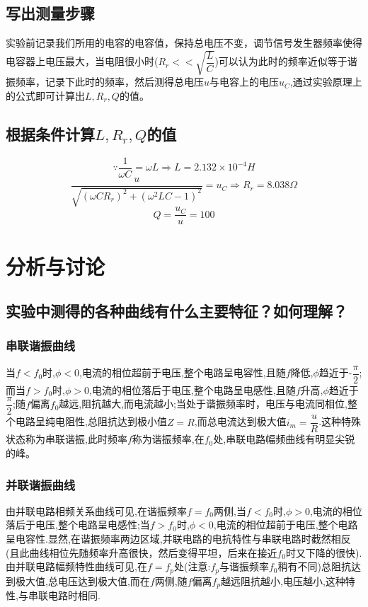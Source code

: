 \documentclass[a4 paper,12pt]{article}
\begin{document}
\subsection{写出测量步骤}
实验前记录我们所用的电容的电容值，保持总电压不变，调节信号发生器频率使得电容器上电压最大，当电阻很小时($R_{r}<<\sqrt{\dfrac{L}{C}}$)可以认为此时的频率近似等于谐振频率，记录下此时的频率，然后测得总电压$u$与电容上的电压$u_{C}$,通过实验原理上的公式即可计算出$L,R_{r},Q$的值。
\subsection{根据条件计算$L,R_{r},Q$的值}
$$\because \dfrac{1}{\omega C}=\omega L\Rightarrow L=2.132\times 10^{-4}H$$
$$\dfrac{u}{\sqrt{(\omega CR_{r})^{2}+(\omega^{2}LC-1)^{2}}}=u_{C}\Rightarrow R_{r}=8.038\Omega$$
$$Q=\dfrac{u_{C}}{u}=100$$
\section{分析与讨论}
\subsection{实验中测得的各种曲线有什么主要特征？如何理解？}
\subsubsection{串联谐振曲线}
当$f<f_{0}$时,$\phi <0$,电流的相位超前于电压,整个电路呈电容性,且随$f$降低,$\phi$趋近于-$\dfrac{\pi}{2}$;而当$f>f_{0}$时,$\phi>0$,电流的相位落后于电压,整个电路呈电感性,且随$f$升高,$\phi$趋近于$\dfrac{\pi}{2}$;随$f$偏离$f_{0}$越远,阻抗越大,而电流越小;当处于谐振频率时，电压与电流同相位,整个电路呈纯电阻性,总阻抗达到极小值$Z=R$,而总电流达到极大值$i_{m}=\dfrac{u}{R}$.这种特殊状态称为串联谐振,此时频率$f$称为谐振频率,在$f_{0}$处,串联电路幅频曲线有明显尖锐的峰。
\subsubsection{并联谐振曲线}
由并联电路相频关系曲线可见,在谐振频率$f=f_{0}$两侧,当$f<f_{0}$时,$\phi>0$,电流的相位落后于电压,整个电路呈电感性;当$f>f_{0}$时,$\phi <0$,电流的相位超前于电压,整个电路呈电容性.显然,在谐振频率两边区域,并联电路的电抗特性与串联电路时截然相反(且此曲线相位先随频率升高很快，然后变得平坦，后来在接近$f_{0}$时又下降的很快).由并联电路幅频特性曲线可见,在$f=f_{p}$处(注意:$f_{p}$与谐振频率$f_{0}$稍有不同)总阻抗达到极大值,总电压达到极大值,而在$f$两侧,随$f$偏离$f_{p}$越远阻抗越小,电压越小,这种特性,与串联电路时相同.
\end{document}
